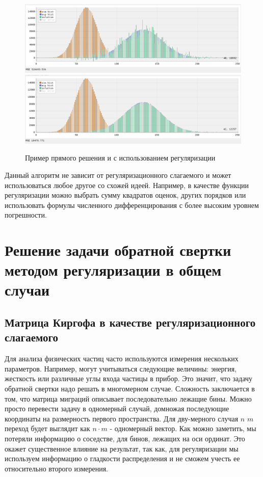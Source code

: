 \documentclass[a4paper,12pt]{diplom}
\begin{document}
\begin{figure}[h]
   \includegraphics[width=\linewidth]{images/example_without_regulazation.png}
   \includegraphics[width=\linewidth]{images/example_regulazation.png}
   \caption{Пример прямого решения и с использованием регуляризации}
\end{figure}

Данный алгоритм не зависит от регуляризационного слагаемого и может использоваться любое другое со схожей идеей. 
Например, в качестве функции регуляризации можно выбрать сумму квадратов оценок, других порядков или использовать формулы численного 
дифференцирования с более высоким уровнем погрешности.



\chapter{Решение задачи обратной свертки методом регуляризации в общем случаи}
\section[Многомерный случай]{Матрица Киргофа в качестве регуляризационного \\ слагаемого}

Для анализа физических частиц часто используются измерения нескольких параметров. Например, могут учитываться следующие величины: 
энергия, жесткость или различные углы входа частицы в прибор. Это значит, что задачу обратной свертки надо решать в многомерном 
случае. Сложность заключается в том, что матрица миграций описывает последовательно лежащие бины. Можно просто перевести задачу 
в одномерный случай, домножая последующие координаты на размерность первого пространства. Для дву-мерного случая $n$ $m$ переход 
будет выглядит как $n \cdot m$ - одномерный вектор. Как можно заметить, мы потеряли информацию о соседстве, для бинов, лежащих на
оси ординат. Это окажет существенное влияние на результат, так как, для регуляризации мы используем информацию о гладкости распределения и не 
сможем учесть ее относительно второго измерения.
\end{document}

